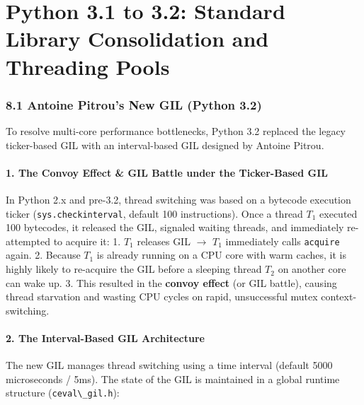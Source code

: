 \hypertarget{python-3.1-to-3.2-standard-library-consolidation-and-threading-pools}{%
\chapter{Python 3.1 to 3.2: Standard Library Consolidation and Threading
Pools}\label{python-3.1-to-3.2-standard-library-consolidation-and-threading-pools}}

\hypertarget{antoine-pitrous-new-gil-python-3.2}{%
\subsection{8.1 Antoine Pitrou's New GIL (Python
3.2)}\label{antoine-pitrous-new-gil-python-3.2}}

To resolve multi-core performance bottlenecks, Python 3.2 replaced the
legacy ticker-based GIL with an interval-based GIL designed by Antoine
Pitrou.

\hypertarget{the-convoy-effect-gil-battle-under-the-ticker-based-gil}{%
\subsubsection{1. The Convoy Effect \& GIL Battle under the Ticker-Based
GIL}\label{the-convoy-effect-gil-battle-under-the-ticker-based-gil}}

In Python 2.x and pre-3.2, thread switching was based on a bytecode
execution ticker (\passthrough{\lstinline!sys.checkinterval!}, default
100 instructions). Once a thread \(T_1\) executed 100 bytecodes, it
released the GIL, signaled waiting threads, and immediately re-attempted
to acquire it: 1. \(T_1\) releases GIL \(\rightarrow\) \(T_1\)
immediately calls \passthrough{\lstinline!acquire!} again. 2. Because
\(T_1\) is already running on a CPU core with warm caches, it is highly
likely to re-acquire the GIL before a sleeping thread \(T_2\) on another
core can wake up. 3. This resulted in the \textbf{convoy effect} (or GIL
battle), causing thread starvation and wasting CPU cycles on rapid,
unsuccessful mutex context-switching.

\hypertarget{the-interval-based-gil-architecture}{%
\subsubsection{2. The Interval-Based GIL
Architecture}\label{the-interval-based-gil-architecture}}

The new GIL manages thread switching using a time interval (default 5000
microseconds / 5ms). The state of the GIL is maintained in a global
runtime structure (\passthrough{\lstinline!ceval\_gil.h!}):

